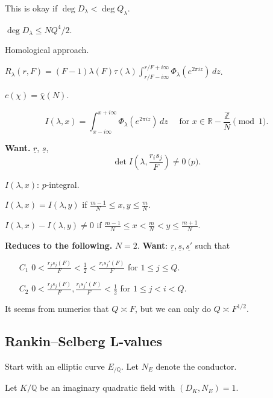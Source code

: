 \documentclass[reqno]{amsart} 
\begin{document}
This is okay if $\deg D_\lambda < \deg Q_\lambda$.

$\deg D_\lambda \leq N Q^4/2$.

Homological approach.

$R_\lambda(r, F) =(F - 1) \lambda(F) \tau(\lambda) \int_{r/F - i \infty}^{r/F + i \infty} \Phi_\lambda \left( e^{2 \pi i z} \right) \, d z$.

$c(\chi) = \bar{\chi}(N)$.

\begin{equation*}
  I(\lambda, x) = \int_{x - i \infty}^{x + i \infty}
  \Phi_\lambda(e^{2 \pi i z}) \, d z
  \quad \text{ for } x \in \mathbb{R} - \frac{\mathbb{Z}}{N} \pmod{1}.
\end{equation*}

\textbf{Want.} $\underline{r}$, $\underline{s}$,
\begin{equation*}
\det I \left( \lambda, \frac{r_i s_j}{F} \right) \neq 0 \pod{p}.
\end{equation*}

$I(\lambda, x)$: $p$-integral.

$I(\lambda, x) = I(\lambda, y)$ if $\frac{m - 1}{N} \leq x, y \leq \frac{m}{N}$.

$I(\lambda, x) - I(\lambda, y) \neq 0$ if $\frac{m - 1}{N} \leq x < \frac{m}{N} < y \leq \frac{m + 1}{N}$.

\textbf{Reduces to the following.}
$N = 2$.  \textbf{Want}: $\underline{r}, \underline{s}, \underline{s'}$ such that
\begin{enumerate}
\item[$C_1$] $0 < \frac{r_j s_j(F) }{F} < \frac{1}{2} < \frac{r_i s_j '(F) }{F}$ for $1 \leq j \leq Q$.
\item[$C_2$] $0 < \frac{r_j s_j(F) }{F}, \frac{r_i s_j '(F) }{F} < \frac{1}{2}$ for $1 \leq j < i < Q$.
\end{enumerate}

\begin{remark}\label{remark:cnfg5j6hsm}
  It seems from numerics that $Q \asymp F$, but we can only do $Q \asymp F^{1/2}$.
\end{remark}

\subsection{Rankin--Selberg L-values}\label{sec:cnfhlpuwet}
Start with an elliptic curve $E_{/\mathbb{Q}}$.  Let $N_E$ denote the conductor.

Let $K/\mathbb{Q}$ be an imaginary quadratic field with $(D_K, N_E) = 1$.
\end{document}
